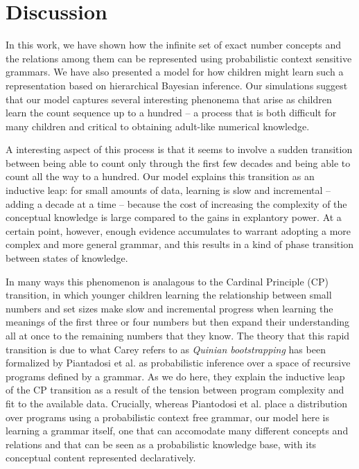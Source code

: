 \documentclass[10pt,letterpaper]{article}
\begin{document}
\section{Discussion}

In this work, we have shown how the infinite set of exact number
concepts and the relations among them can be represented using
probabilistic context sensitive grammars. We have also presented a
model for how children might learn such a representation based on
hierarchical Bayesian inference. Our simulations suggest that our model
captures several interesting phenonema that arise as children learn
the count sequence up to a hundred -- a process that is both difficult
for many children and critical to obtaining adult-like numerical
knowledge.

A interesting aspect of this process is that it seems to
involve a sudden transition between being able to count
only through the first few decades and being able to count all the way
to a hundred. Our model explains this transition as an inductive leap:
for small amounts of data, learning is slow and incremental -- adding
a decade at a time -- because the cost of increasing the complexity of
the conceptual knowledge is large compared to the gains in explantory
power. At a certain point, however, enough evidence accumulates to
warrant adopting a more complex and more general grammar, and this results
in a kind of phase transition between states of knowledge.

In many ways this phenomenon is analagous to the Cardinal Principle
(CP) transition, in which younger children learning the relationship
between small numbers and set sizes make slow and incremental progress
when learning the meanings of the first three or four numbers but then
expand their understanding all at once to the remaining numbers that
they know. The theory that this rapid transition is due to what Carey
refers to as \emph{Quinian bootstrapping} has been formalized by
Piantadosi et al. as probabilistic inference over a space of recursive
programs defined by a grammar. As we do here, they explain the
inductive leap of the CP transition as a result of the tension between
program complexity and fit to the available data. Crucially, whereas
Piantodosi et al. place a distribution over programs using a
probabilistic context free grammar, our model here is learning a
grammar itself, one that can accomodate many different concepts and
relations and that can be seen as a probabilistic knowledge base, with
its conceptual content represented declaratively.
\end{document}
